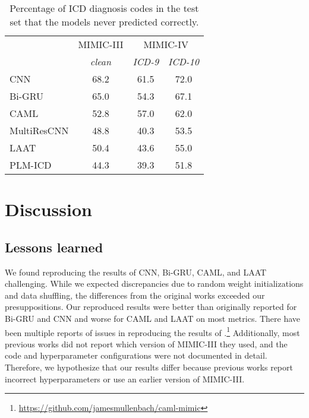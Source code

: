 \documentclass[anonymous=false, sigconf=true, review=false, natbib=true]{acmart}
\begin{document}
 \begin{table}[h]
    \centering
    \caption{Percentage of ICD diagnosis codes in the test set that the models never predicted correctly.}
    \label{tab:missed_classes}
    \begin{tabular}{lccc}
    \toprule
    & MIMIC-III & \multicolumn{2}{c}{MIMIC-IV}\\
    \cmidrule(lr){2-2}\cmidrule(lr){3-4}
     & \textit{clean} &  \textit{ICD-9} & \textit{ICD-10} \\
    \midrule
    CNN  & 68.2 & 61.5 & 72.0\\
    Bi-GRU  & 65.0 & 54.3 & 67.1\\
    CAML & 52.8 & 57.0 & 62.0  \\
    MultiResCNN  & 48.8 & 40.3 & 53.5 \\
    LAAT  & 50.4 & 43.6 & 55.0\\
    PLM-ICD   & 44.3 & 39.3 & 51.8\\
    \bottomrule
    \end{tabular}
\end{table}

    
\section{Discussion}








\subsection{Lessons learned}
We found reproducing the results of CNN, Bi-GRU, CAML, and LAAT challenging. While we expected discrepancies due to random weight initializations and data shuffling, the differences from the original works exceeded our presuppositions. Our reproduced results were better than originally reported for Bi-GRU and CNN and worse for CAML and LAAT on most metrics. There have been multiple reports of issues in reproducing the results of \citet{mullenbachExplainablePredictionMedical2018}.\footnote{\url{https://github.com/jamesmullenbach/caml-mimic}} Additionally, most previous works did not report which version of MIMIC-III they used, and the code and hyperparameter configurations were not documented in detail. Therefore, we hypothesize that our results differ because previous works report incorrect hyperparameters or use an earlier version of MIMIC-III.
\end{document}
